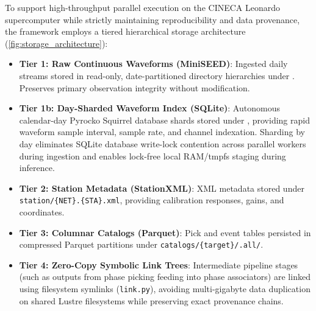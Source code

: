 To support high-throughput parallel execution on the \ac{CINECA}
Leonardo supercomputer while strictly maintaining reproducibility
and data provenance, the framework employs a tiered hierarchical
storage architecture (\cref{fig:storage_architecture}):
\begin{itemize}
  \item \textbf{Tier 1: Raw Continuous Waveforms (MiniSEED)}:
    Ingested daily streams stored in read-only, date-partitioned
    directory hierarchies under
    . Preserves primary
    observation integrity without modification.
  \item \textbf{Tier 1b: Day-Sharded Waveform Index (SQLite)}:
    Autonomous calendar-day Pyrocko \parencite{Pyrocko} Squirrel
    database shards stored
    under , providing rapid waveform
    sample interval, sample rate, and channel indexation. Sharding
    by day eliminates SQLite database write-lock contention across
    parallel workers during ingestion and enables lock-free local
    \ac{RAM}/tmpfs staging during inference.
  \item \textbf{Tier 2: Station Metadata (StationXML)}: XML
    metadata stored under \texttt{station/\{NET\}.\{STA\}.xml},
    providing calibration responses, gains, and coordinates.
  \item \textbf{Tier 3: Columnar Catalogs (Parquet)}: Pick and
    event tables persisted in compressed Parquet partitions under
    \texttt{catalogs/\{target\}/.all/}.
  \item \textbf{Tier 4: Zero-Copy Symbolic Link Trees}:
    Intermediate pipeline stages (such as outputs from phase
    picking feeding into phase associators) are linked using
    filesystem symlinks (\texttt{link.py}), avoiding
    multi-gigabyte data duplication on shared Lustre filesystems
    while preserving exact provenance chains.
\end{itemize}


